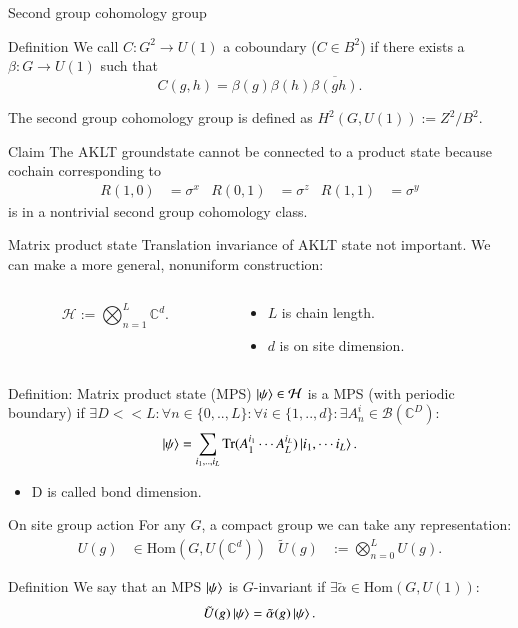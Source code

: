 \documentclass{beamer}
\newcommand{\HH}{\mathcal{H}}
\newcommand{\CC}{\mathbb{C}}
\newcommand{\BB}{\mathcal{B}}
\newcommand{\Tr}{\mathrm{Tr}}
\begin{document}
\begin{frame}{Second group cohomology group}
\begin{block}{Definition}
We call $C:G^2\rightarrow U(1)$ a coboundary ($C\in B^2$) if there exists a $\beta:G\rightarrow U(1)$ such that
\[C(g,h)=\beta(g)\beta(h)\overline{\beta(gh)}.\]
\end{block}
The second group cohomology group is defined as $H^2(G,U(1)):=Z^2/B^2$.
\pause
\begin{block}{Claim}
The AKLT groundstate cannot be connected to a product state because cochain corresponding to
\begin{align*}
R(1,0)&=\sigma^x&R(0,1)&=\sigma^z&R(1,1)&=\sigma^y
\end{align*}
is in a nontrivial second group cohomology class.
\end{block}
\end{frame}

\begin{frame}{Matrix product state}
Translation invariance of AKLT state not important. We can make a more general, nonuniform construction:
\begin{columns}
\begin{column}{0.5\textwidth}
\[\HH := \bigotimes_{n=1}^{L}\CC^{d}.\]
\end{column}
\begin{column}{0.5\textwidth}
\begin{itemize}
\item $L$ is chain length.
\item $d$ is on site dimension.
\end{itemize}
\end{column}
\end{columns}
\pause
\begin{block}{Definition: Matrix product state (MPS)}
$\ket{\psi}\in\HH$ is a MPS (with periodic boundary) if $\exists D<<L:\forall n\in\{0,..,L\}:\forall i\in\{1,..,d\}:\exists A^i_n\in\BB(\CC^D):$
\begin{equation}
\ket{\psi}=\sum_{i_1,..,i_L}\Tr(A^{i_1}_1\cdots A^{i_L}_L)\ket{i_1,\cdots i_L}.
\end{equation}
\end{block}
\pause
\begin{itemize}
\item D is called bond dimension.
\end{itemize}
\end{frame}

\begin{frame}{On site group action}
For any $G$, a compact group we can take any representation:
\begin{align}
U(g)&\in\textrm{Hom}(G,U(\CC^d))&\tilde U(g)&:= \bigotimes_{n=0}^L U(g).
\end{align}
\pause
\begin{block}{Definition}
We say that an MPS $\ket{\psi}$ is $G$-invariant if $\exists \tilde{\alpha}\in\textrm{Hom}(G,U(1)):$
\[\tilde{U}(g)\ket{\psi}=\tilde{\alpha}(g)\ket{\psi}.\]
\end{block}
\end{frame}
\end{document}
